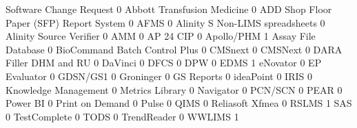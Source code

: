 \documentclass{article}
\begin{document}
\begin{Schunk}
\begin{Soutput}
                                           Software Change Request
                                                                 0
  Abbott Transfusion Medicine                                    0
  ADD Shop Floor Paper (SFP) Report System                       0
  AFMS                                                           0
  Alinity S Non-LIMS spreadsheets                                0
  Alinity Source Verifier                                        0
  AMM                                                            0
  AP 24 CIP                                                      0
  Apollo/PHM                                                     1
  Assay File Database                                            0
  BioCommand Batch Control Plus                                  0
  CMSnext                                                        0
  CMSNext                                                        0
  DARA Filler DHM and RU                                         0
  DaVinci                                                        0
  DFCS                                                           0
  DPW                                                            0
  EDMS                                                           1
  eNovator                                                       0
  EP Evaluator                                                   0
  GDSN/GS1                                                       0
  Groninger                                                      0
  GS Reports                                                     0
  ideaPoint                                                      0
  IRIS                                                           0
  Knowledge Management                                           0
  Metrics Library                                                0
  Navigator                                                      0
  PCN/SCN                                                        0
  PEAR                                                           0
  Power BI                                                       0
  Print on Demand                                                0
  Pulse                                                          0
  QIMS                                                           0
  Reliasoft Xfmea                                                0
  RSLMS                                                          1
  SAS                                                            0
  TestComplete                                                   0
  TODS                                                           0
  TrendReader                                                    0
  WWLIMS                                                         1
                                          

\end{Soutput}
\end{Schunk}
\end{document}
